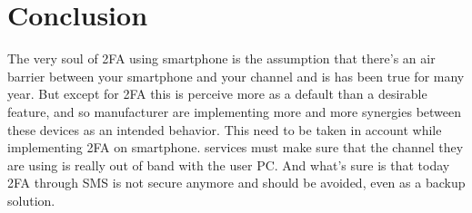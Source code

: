 \documentclass[11pt, a4paper,twocolumn]{article}
\begin{document}
\section{Conclusion}

The very soul of 2FA using smartphone is the assumption that there's an air barrier between your smartphone and your channel and is has been true for many year. But except for 2FA this is perceive more as a default than a desirable feature, and so manufacturer are implementing more and more synergies between these devices as an intended behavior. This need to be taken in account while implementing 2FA on smartphone. services must make sure that the channel they are using is really out of band with the user PC. And what's sure is that today 2FA through SMS is not secure anymore and should be avoided, even as a backup solution.

 

\end{document}
